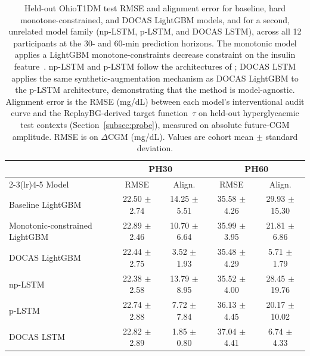 \begin{table}[!htbp]
\caption{Held-out OhioT1DM test RMSE and alignment error for
baseline, hard monotone-constrained, and DOCAS LightGBM models, and for a
second, unrelated model family (np-LSTM, p-LSTM, and DOCAS LSTM), across all
12 participants at the 30- and 60-min prediction horizons. The monotonic model
applies a LightGBM monotone-constraints decrease constraint on the
insulin feature~\citep{ke2017}. np-LSTM and p-LSTM follow the architectures of
\citet{prendin2023}; DOCAS LSTM applies the same synthetic-augmentation
mechanism as DOCAS LightGBM to the p-LSTM architecture, demonstrating that the
method is model-agnostic. Alignment error is the RMSE (mg/dL) between each
model's interventional audit curve and the ReplayBG-derived target
function~$\tau$ on held-out hyperglycaemic test contexts
(Section~\ref{subsec:probe}), measured on absolute future-CGM amplitude.
RMSE is on $\Delta\mathrm{CGM}$
(mg/dL). Values are cohort mean $\pm$ standard deviation.}
\label{tab:ohio}
\begin{tabular*}{\tblwidth}{@{\extracolsep{\fill}}lcccc@{}}
\toprule
 & \multicolumn{2}{c}{PH30} & \multicolumn{2}{c}{PH60} \\
\cmidrule(lr){2-3}\cmidrule(lr){4-5}
Model & RMSE & Align. & RMSE & Align. \\
\midrule
Baseline LightGBM & 22.50 $\pm$ 2.74 & 14.25 $\pm$ 5.51 & 35.58 $\pm$ 4.26 & 29.93 $\pm$ 15.30 \\
Monotonic-constrained LightGBM & 22.89 $\pm$ 2.46 & 10.70 $\pm$ 6.64 & 35.99 $\pm$ 3.95 & 21.81 $\pm$ 6.86 \\
DOCAS LightGBM & 22.44 $\pm$ 2.75 & 3.52 $\pm$ 1.93 & 35.48 $\pm$ 4.29 & 5.71 $\pm$ 1.79 \\
\addlinespace
np-LSTM & 22.38 $\pm$ 2.58 & 13.79 $\pm$ 8.95 & 35.52 $\pm$ 4.00 & 28.45 $\pm$ 19.76 \\
p-LSTM & 22.74 $\pm$ 2.88 & 7.72 $\pm$ 7.84 & 36.13 $\pm$ 4.45 & 20.17 $\pm$ 10.02 \\
DOCAS LSTM & 22.82 $\pm$ 2.89 & 1.85 $\pm$ 0.80 & 37.04 $\pm$ 4.41 & 6.74 $\pm$ 4.33 \\
\bottomrule
\end{tabular*}
\end{table}
